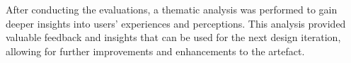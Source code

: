 After conducting the evaluations, a thematic analysis was performed to gain deeper insights into users' experiences and perceptions. 
This analysis provided valuable feedback and insights that can be used for the next design iteration, allowing for further improvements and enhancements to the artefact. 

